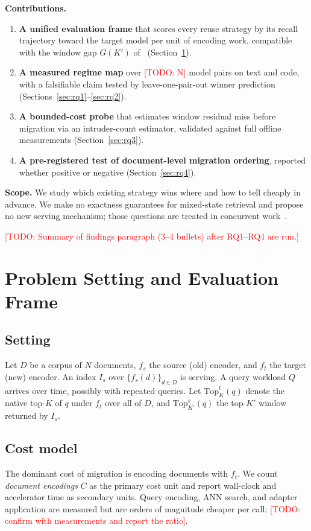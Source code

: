 \documentclass[conference]{IEEEtran}
\newcommand{\todo}[1]{\textcolor{red}{[TODO: #1]}}
\newcommand{\topk}{\mathrm{Top}}
\begin{document}
\textbf{Contributions.}
\begin{enumerate}
\item \textbf{A unified evaluation frame} that scores every reuse strategy by its
recall trajectory toward the target model per unit of encoding work, compatible with
the window gap $G(K')$ of~\cite{embedflow} (Section~\ref{sec:frame}).
\item \textbf{A measured regime map} over \todo{N} model pairs on text and code, with
a falsifiable claim tested by leave-one-pair-out winner prediction
(Sections~\ref{sec:rq1}--\ref{sec:rq2}).
\item \textbf{A bounded-cost probe} that estimates window residual miss before
migration via an intruder-count estimator, validated against full offline
measurements (Section~\ref{sec:rq3}).
\item \textbf{A pre-registered test of document-level migration ordering}, reported
whether positive or negative (Section~\ref{sec:rq4}).
\end{enumerate}

\textbf{Scope.} We study which existing strategy wins where and how to tell cheaply in
advance. We make no exactness guarantees for mixed-state retrieval and propose no new
serving mechanism; those questions are treated in concurrent
work~\cite{thaw-anon}.

\todo{Summary of findings paragraph (3--4 bullets) after RQ1--RQ4 are run.}

\section{Problem Setting and Evaluation Frame}\label{sec:frame}

\subsection{Setting}
Let $D$ be a corpus of $N$ documents, $f_s$ the source (old) encoder, and $f_t$ the
target (new) encoder. An index $I_s$ over $\{f_s(d)\}_{d\in D}$ is serving. A query
workload $Q$ arrives over time, possibly with repeated queries. Let
$\topk_K^{t}(q)$ denote the native top-$K$ of $q$ under $f_t$ over all of $D$, and
$\topk_{K'}^{s}(q)$ the top-$K'$ window returned by $I_s$.

\subsection{Cost model}
The dominant cost of migration is encoding documents with $f_t$. We count
\emph{document encodings} $C$ as the primary cost unit and report wall-clock and
accelerator time as secondary units. Query encoding, ANN search, and adapter
application are measured but are orders of magnitude cheaper per call;
\todo{confirm with measurements and report the ratio}.
\end{document}
